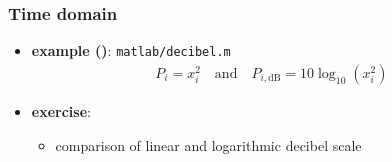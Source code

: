 \begin{frame} %
	\frametitle{Time domain}
	\begin{itemize}
		\item \textbf{example ()}: \texttt{matlab/decibel.m} 
			\begin{align*}
				P_i=x_i^2\quad\textrm{and}\quad P_{i,\textrm{dB}}=10\log_{10}(x_i^2)
			\end{align*}
			\begin{figure}
				\centering
				\begin{subfigure}[c]{0.48\linewidth}
				\end{subfigure}
				\hspace{0.01\linewidth}
				\begin{subfigure}[c]{0.48\linewidth}
				\end{subfigure}
			\end{figure}
		\item \textbf{exercise}:
			\begin{itemize}
				\item comparison of linear and logarithmic decibel scale
			\end{itemize}
	\end{itemize}
\end{frame}

